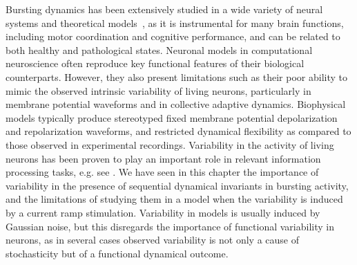 Bursting dynamics has been extensively studied in a wide variety of neural systems and theoretical models~\parencite{coombes2005bursting,izhikevich_dynamical_2007,Zendenrust18}, as it is instrumental for many brain functions, including motor coordination and cognitive performance, and can be related to both healthy and pathological states. Neuronal models in computational neuroscience often reproduce key functional features of their biological counterparts. However, they also present limitations such as their poor ability to mimic the observed intrinsic variability of living neurons, particularly in membrane potential waveforms and in collective adaptive dynamics. Biophysical models typically produce stereotyped fixed membrane potential depolarization and repolarization waveforms, and restricted dynamical flexibility as compared to those observed in experimental recordings. Variability in the activity of living neurons has been proven to play an important role in relevant information processing tasks, e.g. see  \parencite{Stein2005, renart_variability_2014, Waschke2021}. We have seen in this chapter the importance of variability in the presence of sequential dynamical invariants in bursting activity, and the limitations of studying them in a model when the variability is induced by a current ramp stimulation. Variability in models is usually induced by Gaussian noise, but this disregards the importance of functional variability in neurons, as in several cases observed variability is not only a cause of stochasticity  but of a functional dynamical outcome. 

